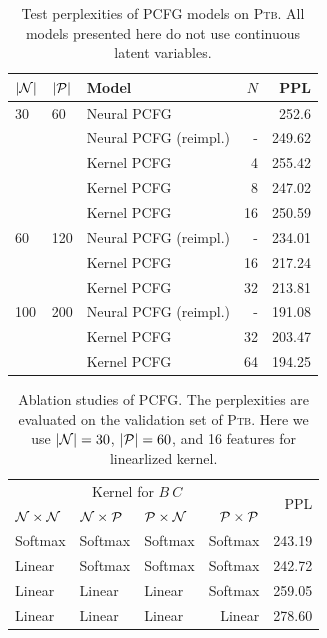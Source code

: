 \documentclass{article}
\begin{document}
\begin{table}[!t]
\centering
\begin{tabular}{@{}lllrr@{}}
\toprule
$|\mathcal{N}|$ & $|\mathcal{P}|$ & Model & $N$ &  PPL \\
\midrule
30  & 60    & Neural PCFG &\hspace{-1.7cm}\citep{kim2019cpcfg}  & 252.6\\
    &       & Neural PCFG (reimpl.) & - & 249.62    \\
    &       & Kernel PCFG       & 4 & 255.42          \\
    &       & Kernel PCFG       & 8 &  247.02         \\
    &       & Kernel PCFG       & 16 & 250.59        \\
\midrule
60  & 120   & Neural PCFG (reimpl.) & - & 234.01\\ %
    &       & Kernel PCFG       & 16& 217.24 \\
    &       & Kernel PCFG       & 32& 213.81 \\
\midrule
100 & 200   & Neural PCFG (reimpl.) & - &  191.08    \\
    &       & Kernel PCFG       & 32& 203.47 \\
    &       & Kernel PCFG       & 64& 194.25 \\
\bottomrule
\end{tabular}
\caption{\label{tbl:cky}
Test perplexities of PCFG models on \textsc{Ptb}. All models presented here do not use continuous latent variables.
}
\end{table}

\begin{table}[!htp]
\centering
\begin{tabular}{lllrr}
\toprule
\multicolumn{4}{c}{Kernel for $B\ C $} & \multirow{2}{*}{PPL}\\
\cmidrule{1-4}
$\mathcal{N}\times \mathcal{N}$ & $\mathcal{N}\times\mathcal{P}$  & $\mathcal{P}\times\mathcal{N}$ & $\mathcal{P}\times\mathcal{P}$ \\
\midrule
  Softmax & Softmax & Softmax & Softmax & 243.19\\
  Linear & Softmax & Softmax & Softmax & 242.72\\
  Linear & Linear & Linear & Softmax &  259.05 \\
  Linear & Linear & Linear & Linear & 278.60 \\
\bottomrule
\end{tabular}
\caption{\label{tbl:cky-ablation}
Ablation studies of PCFG. The perplexities are evaluated on the validation set of \textsc{Ptb}. Here we use $|\mathcal{N}|=30$, $|\mathcal{P}|=60$, and 16 features for linearlized kernel.
}
\end{table}
\end{document}
